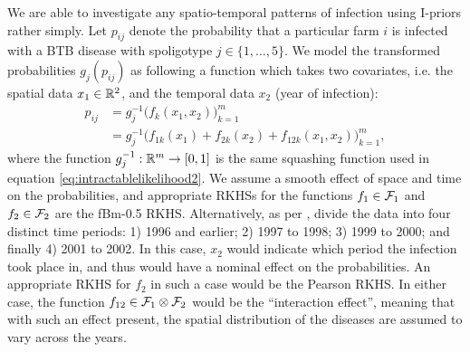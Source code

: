 \documentclass[showframe,11pt]{report}\usepackage[]{graphicx}\usepackage{xcolor}
\begin{document}
We are able to investigate any spatio-temporal patterns of infection using I-priors rather simply.
Let $p_{ij}$ denote the probability that a particular farm $i$ is infected with a BTB disease with spoligotype $j \in \{1,\dots,5\}$.
We model the transformed probabilities $g_j(p_{ij})$ as following a function which takes two covariates, i.e. the spatial data $x_1 \in \mathbb{R}^2$, and the temporal data $x_2$ (year of infection):
\begin{align*}
  p_{ij}
  &= g_j^{-1} \big( f_k(x_1, x_2) \big)_{k=1}^m \\
  &= g_j^{-1} \big( f_{1k}(x_1) + f_{2k}(x_2) + f_{12k}(x_1, x_2) \big)_{k=1}^m,
\end{align*}
where the function $g_j^{-1}:\mathbb{R}^m \to [0,1]$ is the same squashing function used in equation \cref{eq:intractablelikelihood2}.
We assume a smooth effect of space and time on the probabilities, and appropriate RKHSs for the functions $f_1 \in {\mathcal F}_1$ and $f_2 \in {\mathcal F}_2$ are the fBm-0.5 RKHS.
Alternatively, as per \citet{diggle2005nonparametric}, divide the data into four distinct time periods:
1) 1996 and earlier;
2) 1997 to 1998;
3) 1999 to 2000;
and finally 4) 2001 to 2002.
In this case, $x_2$ would indicate which period the infection took place in, and thus would have a nominal effect on the probabilities.
An appropriate RKHS for $f_2$ in such a case would be the Pearson RKHS.
In either case, the function $f_{12} \in {\mathcal F}_1 \otimes {\mathcal F}_2$ would be the ``interaction effect'', meaning that with such an effect present, the spatial distribution of the diseases are assumed to vary across the years.
\end{document}
